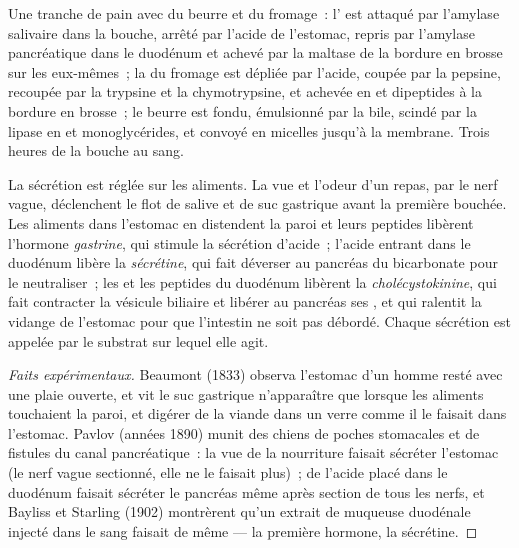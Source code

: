 \begin{example}\label{ex:b1:digestion-absorption:meal}
Une tranche de pain avec du beurre et du fromage~: l' est attaqué
par l'amylase salivaire dans la bouche, arrêté par l'acide de
l'estomac, repris par l'amylase pancréatique dans le duodénum et achevé
par la maltase de la bordure en brosse sur les  eux-mêmes~;
la  du fromage est dépliée par l'acide, coupée par la pepsine,
recoupée par la trypsine et la chymotrypsine, et achevée en  et dipeptides à la bordure en brosse~; le beurre est fondu,
émulsionné par la bile, scindé par la lipase en  et
monoglycérides, et convoyé en micelles jusqu'à la membrane. Trois
heures de la bouche au sang.
\end{example}

\begin{proposition}\label{prop:b1:digestion-absorption:control}
La sécrétion est réglée sur les aliments. La vue et l'odeur d'un repas,
par le nerf vague, déclenchent le flot de salive et de suc gastrique
avant la première bouchée. Les aliments dans l'estomac en distendent la
paroi et leurs peptides libèrent l'hormone \emph{gastrine}, qui stimule
la sécrétion d'acide~; l'acide entrant dans le duodénum libère la
\emph{sécrétine}, qui fait déverser au pancréas du bicarbonate pour le
neutraliser~; les  et les peptides du duodénum libèrent la
\emph{cholécystokinine}, qui fait contracter la vésicule biliaire et
libérer au pancréas ses , et qui ralentit la vidange de
l'estomac pour que l'intestin ne soit pas débordé. Chaque sécrétion est
appelée par le substrat sur lequel elle agit.
\end{proposition}
\begin{proof}[Faits expérimentaux]
Beaumont (1833) observa l'estomac d'un homme resté avec une plaie
ouverte, et vit le suc gastrique n'apparaître que lorsque les aliments
touchaient la paroi, et digérer de la viande dans un verre comme il le
faisait dans l'estomac. Pavlov (années 1890) munit des chiens de poches
stomacales et de fistules du canal pancréatique~: la vue de la
nourriture faisait sécréter l'estomac (le nerf vague sectionné, elle ne
le faisait plus)~; de l'acide placé dans le duodénum faisait sécréter le
pancréas même après section de tous les nerfs, et Bayliss et Starling
(1902) montrèrent qu'un extrait de muqueuse duodénale injecté dans le
sang faisait de même --- la première hormone, la sécrétine.
\end{proof}

